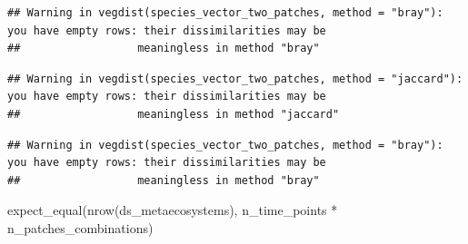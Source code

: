 \documentclass[
]{article}
\newenvironment{Shaded}{\begin{snugshade}}{\end{snugshade}}
\newcommand{\AttributeTok}[1]{\textcolor[rgb]{0.77,0.63,0.00}{#1}}
\newcommand{\CommentTok}[1]{\textcolor[rgb]{0.56,0.35,0.01}{\textit{#1}}}
\newcommand{\FunctionTok}[1]{\textcolor[rgb]{0.00,0.00,0.00}{#1}}
\newcommand{\NormalTok}[1]{#1}
\newcommand{\OtherTok}[1]{\textcolor[rgb]{0.56,0.35,0.01}{#1}}
\newcommand{\SpecialCharTok}[1]{\textcolor[rgb]{0.00,0.00,0.00}{#1}}
\newcommand{\StringTok}[1]{\textcolor[rgb]{0.31,0.60,0.02}{#1}}
\begin{document}
\begin{verbatim}
## Warning in vegdist(species_vector_two_patches, method = "bray"): you have empty rows: their dissimilarities may be
##                  meaningless in method "bray"
\end{verbatim}

\begin{verbatim}
## Warning in vegdist(species_vector_two_patches, method = "jaccard"): you have empty rows: their dissimilarities may be
##                  meaningless in method "jaccard"
\end{verbatim}

\begin{verbatim}
## Warning in vegdist(species_vector_two_patches, method = "bray"): you have empty rows: their dissimilarities may be
##                  meaningless in method "bray"
\end{verbatim}

\begin{Shaded}
\begin{Highlighting}[]
\FunctionTok{expect\_equal}\NormalTok{(}\FunctionTok{nrow}\NormalTok{(ds\_metaecosystems), }
\NormalTok{             n\_time\_points }\SpecialCharTok{*}\NormalTok{ n\_patches\_combinations)}
\end{Highlighting}
\end{Shaded}

\begin{Shaded}
\end{Shaded}
\end{document}
